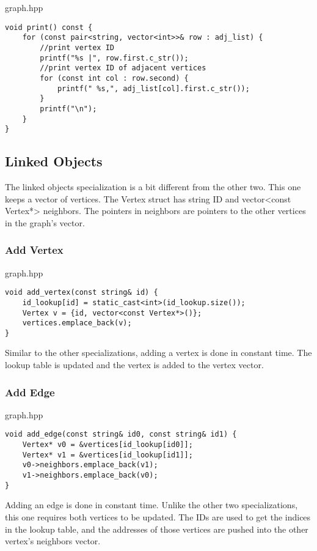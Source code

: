 \documentclass[letterpaper, 10pt,DIV=13]{scrartcl}
\numberwithin{equation}{section} %
\numberwithin{figure}{section} %
\numberwithin{table}{section} %
\begin{document}
graph.hpp
\begin{verbatim}
void print() const {
    for (const pair<string, vector<int>>& row : adj_list) {
        //print vertex ID
        printf("%s |", row.first.c_str());
        //print vertex ID of adjacent vertices
        for (const int col : row.second) {
            printf(" %s,", adj_list[col].first.c_str());
        }
        printf("\n");
    }
}
\end{verbatim}

\subsection{Linked Objects}
The linked objects specialization is a bit different from the other two. This one keeps a vector of
vertices. The Vertex struct has string ID and vector<const Vertex*> neighbors. The pointers in neighbors
are pointers to the other vertices in the graph's vector.

\subsubsection{Add Vertex}

graph.hpp
\begin{verbatim}
void add_vertex(const string& id) {
    id_lookup[id] = static_cast<int>(id_lookup.size());
    Vertex v = {id, vector<const Vertex*>()};
    vertices.emplace_back(v);
}
\end{verbatim}

Similar to the other specializations, adding a vertex is done in constant time. The lookup table is updated
and the vertex is added to the vertex vector.

\subsubsection{Add Edge}

graph.hpp
\begin{verbatim}
void add_edge(const string& id0, const string& id1) {
    Vertex* v0 = &vertices[id_lookup[id0]];
    Vertex* v1 = &vertices[id_lookup[id1]];
    v0->neighbors.emplace_back(v1);
    v1->neighbors.emplace_back(v0);
}
\end{verbatim}

Adding an edge is done in constant time. Unlike the other two specializations, this one requires both
vertices to be updated. The IDs are used to get the indices in the lookup table, and the addresses of those
vertices are pushed into the other vertex's neighbors vector.
\end{document}
